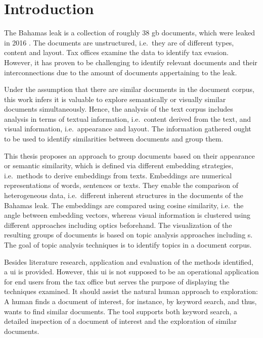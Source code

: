 \chapter{Introduction}\label{ch:introduction}

The Bahamas leak is a collection of roughly 38 \ac{gb} documents, which were leaked in 2016 \cite{data-corpus-bahamas-leaks}.
The documents are unstructured, i.e.\ they are of different types, content and layout.
Tax offices examine the data to identify tax evasion.
However, it has proven to be challenging to identify relevant documents and their interconnections due to the amount of documents appertaining to the leak.

Under the assumption that there are similar documents in the document corpus, 
this work infers it is valuable to explore semantically or visually similar documents simultaneously.
Hence, the analysis of the text corpus includes analysis in terms of textual information, i.e.\ content derived from the text, 
and visual information, i.e.\ appearance and layout.
The information gathered ought to be used to identify similarities between documents and group them.

This thesis proposes an approach to group documents based on their appearance or semantic similarity, 
which is defined via different embedding strategies, i.e.\ methods to derive embeddings from texts.
Embeddings are numerical representations of words, sentences or texts.
They enable the comparison of heterogeneous data, i.e.\ different inherent structures in the documents of the Bahamas leak.
The embeddings are compared using cosine similarity, i.e.\ the angle between embedding vectors, 
whereas visual information is clustered using different approaches including \ac{optics} beforehand.
The visualization of the resulting groups of documents is based on topic analysis approaches including \wordcloud{}s.
The goal of topic analysis techniques is to identify topics in a document corpus.

Besides literature research, application and evaluation of the methods identified, 
a \ac{ui} is provided.
However, this \ac{ui} is not supposed to be an operational application for end users from the tax office 
but serves the purpose of displaying the techniques examined.
It should assist the natural human approach to exploration:
A human finds a document of interest, for instance, by keyword search, and thus, wants to find similar documents.
The tool supports both keyword search, a detailed inspection of a document of interest and the exploration of similar documents.
